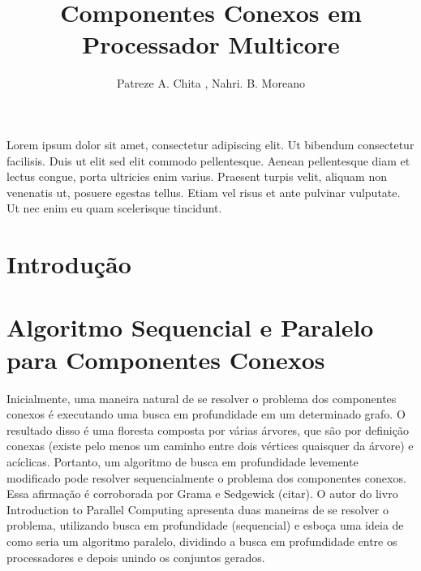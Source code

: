 \documentclass[12pt]{article}
\title{Componentes Conexos em Processador Multicore}
\author{Patreze A. Chita \inst{1}, Nahri. B. Moreano\inst{1}}
\begin{document}
 

\maketitle

     
\begin{resumo} 
Lorem ipsum dolor sit amet, consectetur adipiscing elit. Ut bibendum consectetur facilisis. Duis ut elit sed elit commodo pellentesque. Aenean pellentesque diam et lectus congue, porta ultricies enim varius. Praesent turpis velit, aliquam non venenatis ut, posuere egestas tellus. Etiam vel risus et ante pulvinar vulputate. Ut nec enim eu quam scelerisque tincidunt.
\end{resumo}

\section{Introdução}
{\color{gray}\lipsum[1]}

\section{Algoritmo Sequencial e Paralelo para Componentes Conexos}

Inicialmente, uma maneira natural de se resolver o problema dos componentes conexos é executando uma busca em profundidade em um determinado grafo. O resultado disso é uma floresta composta por várias árvores, que são por definição conexas (existe pelo menos um caminho entre dois vértices quaisquer da árvore) e acíclicas. Portanto, um algoritmo de busca em profundidade levemente modificado pode resolver sequencialmente o problema dos componentes conexos. Essa afirmação é corroborada por Grama e Sedgewick (citar). O autor do livro Introduction to Parallel Computing apresenta duas maneiras de se resolver o problema, utilizando busca em profundidade (sequencial) e esboça uma ideia de como seria um algoritmo paralelo, dividindo a busca em profundidade entre os processadores e depois unindo os conjuntos gerados.
\end{document}
